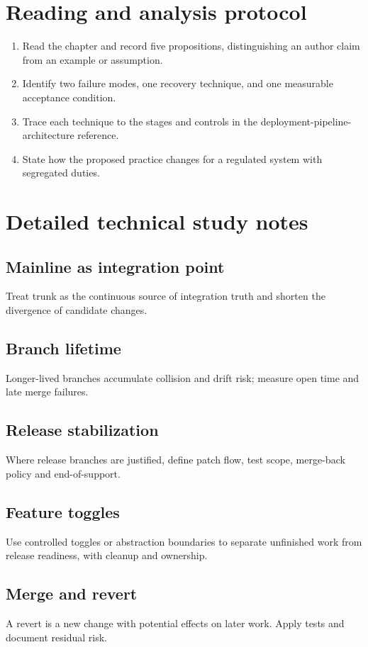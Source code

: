 \documentclass[10pt,letterpaper]{article}
\begin{document}
\section{Reading and analysis protocol}
\begin{enumerate}
\item Read the chapter and record five propositions, distinguishing an author claim from an example or assumption.
\item Identify two failure modes, one recovery technique, and one measurable acceptance condition.
\item Trace each technique to the stages and controls in the deployment-pipeline-architecture reference.
\item State how the proposed practice changes for a regulated system with segregated duties.
\end{enumerate}

\section{Detailed technical study notes}
\subsection{Mainline as integration point}
Treat trunk as the continuous source of integration truth and shorten the divergence of candidate changes.

\subsection{Branch lifetime}
Longer-lived branches accumulate collision and drift risk; measure open time and late merge failures.

\subsection{Release stabilization}
Where release branches are justified, define patch flow, test scope, merge-back policy and end-of-support.

\subsection{Feature toggles}
Use controlled toggles or abstraction boundaries to separate unfinished work from release readiness, with cleanup and ownership.

\subsection{Merge and revert}
A revert is a new change with potential effects on later work. Apply tests and document residual risk.
\end{document}
